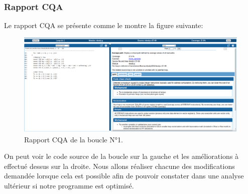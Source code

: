 \documentclass[a4paper, 12pt, twoside]{article}
\begin{document}
   \subsubsection*{Rapport CQA}
   Le rapport CQA se présente comme le montre la figure suivante:
         \begin{figure}[h]
    \centering
    \includegraphics[width=\textwidth]{Figures/cap4.png}
    \caption{Rapport CQA de la boucle N°1.}
    
    \end{figure}
    On peut voir le code source de la boucle sur la gauche et les améliorations à effectué dessus sur la droite. Nous allons réaliser chacune des modifications
demandée lorsque cela est possible afin de pouvoir constater dans une analyse ultérieur si notre programme est optimisé.
\end{document}
